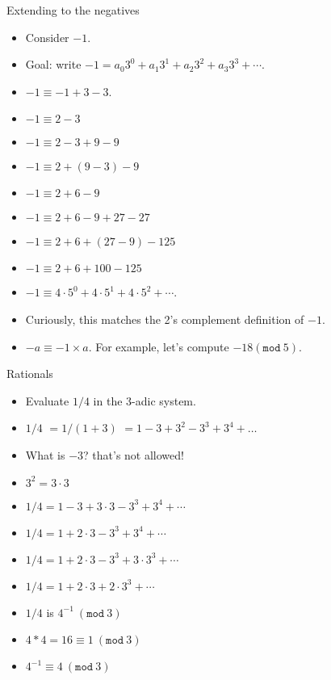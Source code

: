 \documentclass[8pt]{beamer}
\renewcommand{\mod}[1]{\left( \texttt{mod}~#1 \right)}
\begin{document}
\begin{frame}{Extending to the negatives}

\begin{itemize}
\item Consider $-1$. \pause
\item Goal: write $-1 = a_0 3^0 + a_1 3^1 + a_2 3^2 + a_3 3^3 + \cdots$.
\item $-1 \equiv -1 + 3 - 3$. \pause
\item $-1 \equiv 2 - 3$ \pause
\item $-1 \equiv 2 - 3 + 9 - 9$ \pause
\item $-1 \equiv 2 + (9 - 3) - 9$ \pause
\item $-1 \equiv 2 + 6 - 9$ \pause
\item $-1 \equiv 2 + 6 - 9 + 27 - 27$ \pause
\item $-1 \equiv 2 + 6 + (27 - 9) - 125$ \pause
\item $-1 \equiv 2 + 6 + 100 - 125$ \pause
\item $-1 \equiv 4\cdot 5^0 + 4 \cdot 5^1 + 4 \cdot 5^2 + \cdots$. \pause
\item Curiously, this matches the 2's complement definition of $-1$.\pause
\item $-a \equiv -1 \times a$. For example, let's compute $-18 \mod{5}$.
\end{itemize}
\end{frame}

\begin{frame}{Rationals}
\begin{itemize}
\item Evaluate $1/4$ in the $3$-adic system. \pause
\item $1/4$ \pause $ = 1/(1+3)$ \pause $ = 1 - 3 + 3^2 - 3^3 + 3^4 + \dots$\pause
\item What is $-3$? that's not allowed! \pause
\item $3^2 = 3 \cdot 3$ \pause
\item $1/4 = 1 - 3 + 3\cdot 3 - 3^3 + 3^4 + \cdots$ \pause
\item $1/4 = 1  + 2\cdot 3 - 3^3 + 3^4 + \cdots$ \pause
\item $1/4 = 1  + 2\cdot 3 - 3^3 + 3\cdot 3^3 + \cdots$ \pause
\item $1/4 = 1  + 2\cdot 3 + 2\cdot 3^3 + \cdots$ \pause
\item $1/4$ is $4^{-1}~\mod{3}$ \pause
\item $4*4 = 16 \equiv 1~\mod{3}$ \pause
\item $4^{-1} \equiv 4 ~\mod{3}$\pause
\end{itemize}
\end{frame}
\end{document}
